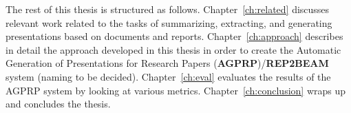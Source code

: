 
The rest of this thesis is structured as follows. Chapter~\ref{ch:related} discusses relevant work related to the tasks of summarizing, extracting, and generating presentations based on documents and reports. Chapter~\ref{ch:approach} describes in detail the approach developed in this thesis in order to create the Automatic Generation of Presentations for Research Papers (\textbf{AGPRP})/\textbf{REP2BEAM} system (naming to be decided). Chapter~\ref{ch:eval} evaluates the results of the AGPRP system by looking at various metrics. Chapter~\ref{ch:conclusion} wraps up and concludes the thesis.